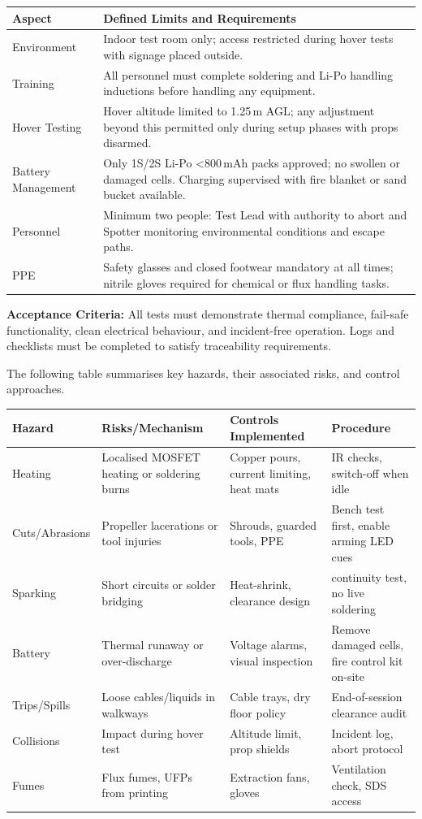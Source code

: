 \begin{tabular}{|p{4cm}|p{11.5cm}|}
\hline
\rowcolor{gray!15}\textbf{Aspect} & \textbf{Defined Limits and Requirements} \\ \hline
Environment & Indoor test room only; access restricted during hover tests with signage placed outside. \\ \hline
Training & All personnel must complete soldering and Li-Po handling inductions before handling any equipment. \\ \hline
Hover Testing & Hover altitude limited to 1.25\,m AGL; any adjustment beyond this permitted only during setup phases with props disarmed. \\ \hline
Battery Management & Only 1S/2S Li-Po <800\,mAh packs approved; no swollen or damaged cells. Charging supervised with fire blanket or sand bucket available. \\ \hline
Personnel & Minimum two people: Test Lead with authority to abort and Spotter monitoring environmental conditions and escape paths. \\ \hline
PPE & Safety glasses and closed footwear mandatory at all times; nitrile gloves required for chemical or flux handling tasks. \\ \hline
\end{tabular}

\vspace{0.5em}
\textbf{Acceptance Criteria:} All tests must demonstrate thermal compliance, fail-safe functionality, clean electrical behaviour, and incident-free operation. Logs and checklists must be completed to satisfy traceability requirements.

The following table summarises key hazards, their associated risks, and control approaches.

\begin{tabular}{|p{2.3cm}|p{4.5cm}|p{4cm}|p{3.8cm}|}
\hline
\rowcolor{gray!15}\textbf{Hazard} & \textbf{Risks/Mechanism} & \textbf{Controls Implemented} & \textbf{Procedure} \\ \hline
Heating & Localised MOSFET heating or soldering burns & Copper pours, current limiting, heat mats & IR checks, switch-off when idle \\ \hline
Cuts/Abrasions & Propeller lacerations or tool injuries & Shrouds, guarded tools, PPE & Bench test first, enable arming LED cues \\ \hline
Sparking & Short circuits or solder bridging & Heat-shrink, clearance design & continuity test, no live soldering \\ \hline
Battery & Thermal runaway or over-discharge & Voltage alarms, visual inspection & Remove damaged cells, fire control kit on-site \\ \hline
Trips/Spills & Loose cables/liquids in walkways & Cable trays, dry floor policy & End-of-session clearance audit \\ \hline
Collisions & Impact during hover test & Altitude limit, prop shields & Incident log, abort protocol \\ \hline
Fumes & Flux fumes, UFPs from printing & Extraction fans, gloves & Ventilation check, SDS access \\ \hline
\end{tabular}


